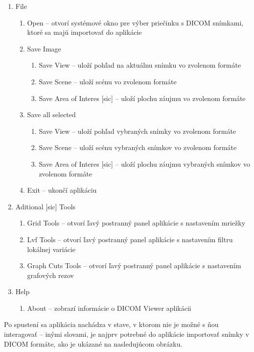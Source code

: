 {\begin {enumerate}
\item {File}
	\begin {enumerate}
		\item {Open -- otvorí systémové okno pre výber priečinku s DICOM snímkami, ktoré sa majú importovať do aplikácie}
		\item {Save Image}
		\begin {enumerate}
			\item {Save View -- uloží pohľad na aktuálnu snímku vo zvolenom formáte}
			\item {Save Scene -- uloží scénu vo zvolenom formáte}
			\item {Save Area of Interes [sic] -- uloží plochu záujmu vo zvolenom formáte}
		\end {enumerate}
	\item {Save all selected}
		\begin {enumerate}
			\item {Save View -- uloží pohľad vybraných snímky vo zvolenom formáte}
			\item {Save Scene -- uloží scénu vybraných snímkov vo zvolenom formáte}
			\item {Save Area of Interes [sic] -- uloží plochu záujmu vybraných snímkov vo zvolenom formáte}
		\end {enumerate}	
	\item {Exit -- ukončí aplikáciu}
	\end {enumerate}
\item {Aditional [sic] Tools}
	\begin {enumerate}
	\item {Grid Tools -- otvorí ľavý postranný panel aplikácie s nastavením mriežky}
	\item {Lvf Tools -- otvorí ľavý postranný panel aplikácie s nastavením filtru lokálnej variácie}
	\item {Graph Cuts Tools -- otvorí ľavý postranný panel aplikácie s nastavením grafových rezov}
	\end {enumerate}
\item {Help}
	\begin {enumerate}
	\item {About -- zobrazí informácie o DICOM Viewer aplikácii}
	\end {enumerate}
\end {enumerate}

Po spustení sa aplikácia nachádza v stave, v ktorom nie je možné s ňou interagovať -- inými slovami, je najprv potrebné do aplikácie importovať snímky v DICOM formáte, ako je ukázané na nasledujúcom obrázku.

}

